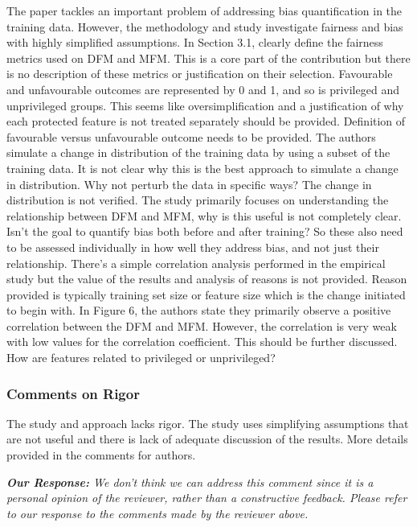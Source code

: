 \documentclass[conference,review,anonymous]{IEEEtran}
\newcommand{\highlight}[1]{\begin{framed}%
  \noindent\emph{#1}
\end{framed}}
\begin{document}
The paper tackles an important problem of addressing bias
quantification in the training data. However, the methodology and
study investigate fairness and bias with highly simplified
assumptions. In Section 3.1, clearly define the fairness metrics used
on DFM and MFM. This is a core part of the contribution but there is
no description of these metrics or justification on their
selection. Favourable and unfavourable outcomes are represented by
0 and 1, and so is privileged and unprivileged groups. This seems like
oversimplification and a justification of why each protected feature
is not treated separately should be provided. Definition of favourable
versus unfavourable outcome needs to be provided. The authors simulate
a change in distribution of the training data by using a subset of the
training data. It is not clear why this is the best approach to
simulate a change in distribution. Why not perturb the data in
specific ways? The change in distribution is not verified. The study
primarily focuses on understanding the relationship between DFM and
MFM, why is this useful is not completely clear. Isn't the goal to
quantify bias both before and after training? So these also need to be
assessed individually in how well they address bias, and not just
their relationship.  There's a simple correlation analysis performed
in the empirical study but the value of the results and analysis of
reasons is not provided. Reason provided is typically training set
size or feature size which is the change initiated to begin with. In
Figure 6, the authors state they primarily observe a positive
correlation between the DFM and MFM. However, the correlation is very
weak with low values for the correlation coefficient. This should be
further discussed. How are features related to privileged or
unprivileged?

\subsubsection{Comments on Rigor}

The study and approach lacks rigor. The study uses simplifying
assumptions that are not useful and there is lack of adequate
discussion of the results. More details provided in the comments for
authors.

\highlight{\emph{\textbf{Our Response:}} We don't think we can address
this comment since it is a personal opinion of the reviewer, rather
than a constructive feedback. Please refer to our response to the
comments made by the reviewer above.}
\end{document}
